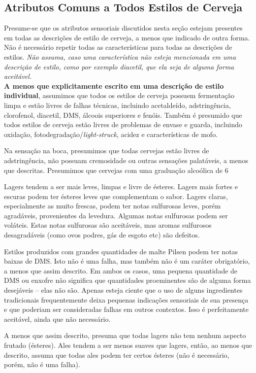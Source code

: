 \subsection*{Atributos Comuns a Todos Estilos de Cerveja}
Presume-se que os atributos sensoriais discutidos nesta seção estejam presentes em todas as descrições de estilo de cerveja, a menos que indicado de outra forma. Não é necessário repetir todas as características para todas as descrições de estilos. \textit{Não assuma, caso uma característica não esteja mencionada em uma descrição de estilo, como por exemplo diacetil, que ela seja de alguma forma aceitável.}\\
\textbf{A menos que explicitamente escrito em uma descrição de estilo individual}, assumimos que todos os estilos de cerveja possuem fermentação limpa e estão livres de falhas técnicas, incluindo acetaldeído, adstringência, clorofenol, diacetil, DMS, álcoois superiores e fenóis. Também é presumido que todos estilos de cerveja estão livres de problemas de envase e guarda, incluindo oxidação, fotodegradação/\textit{light-struck}, acidez e características de mofo.

Na sensação na boca, presumimos que todas cervejas estão livres de adstringência, não possuam cremosidade ou outras sensações palatáveis, a menos que descritas. Presumimos que cervejas com uma graduação alcoólica de 6%

Lagers tendem a ser mais leves, limpas e livre de ésteres. Lagers mais fortes e escuras podem ter ésteres leves que complementam o sabor. Lagers claras, especialmente as muito frescas, podem ter notas sulfurosas leves, porém agradáveis, provenientes da levedura. Algumas notas sulfurosas podem ser voláteis. Estas notas sulfurosas são aceitáveis, mas aromas sulfurosos desagradáveis (como ovos podres, gás de esgoto etc) são defeitos.

Estilos produzidos com grandes quantidades de malte Pilsen podem ter notas baixas de DMS. Isto não é uma falha, mas também não é um caráter obrigatório, a menos que assim descrito. Em ambos os casos, uma pequena quantidade de DMS ou enxofre não significa que quantidades proeminentes são de alguma forma desejáveis – elas não são. Apenas esteja ciente que o uso de alguns ingredientes tradicionais frequentemente deixa pequenas indicações sensoriais de sua presença e que poderiam ser consideradas falhas em outros contextos. Isso é perfeitamente aceitável, ainda que não necessário.

A menos que assim descrito, presuma que todas lagers não tem nenhum aspecto frutado (ésteres). Ales tendem a ser menos suaves que lagers, então, ao menos que descrito, assuma que todas ales podem ter certos ésteres (não é necessário, porém, não é uma falha).
